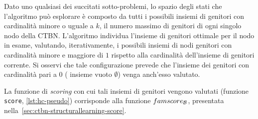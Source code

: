Dato uno qualsiasi dei succitati sotto-problemi, lo spazio degli stati che l'algoritmo \emph{\keyword{\hc{}}} può esplorare è composto da tutti i possibili insiemi di genitori con cardinalità minore o uguale a $k$, il numero massimo di genitori di ogni singolo nodo della \acs{CTBN}. L'algoritmo \emph{\keyword{\hc{}}} individua l'insieme di genitori ottimale per il nodo in esame, valutando, iterativamente, i possibili insiemi di nodi genitori con cardinalità minore e maggiore di $1$ rispetto alla cardinalità dell'insieme di genitori corrente. Si osservi che tale configurazione prevede che l'insieme dei genitori con cardinalità pari a $0$ (\ie{} insieme vuoto $\emptyset$) venga anch'esso valutato.

La funzione di \emph{scoring} con cui tali insiemi di genitori vengono valutati (funzione \lstinline[]|score|, \autoref{lst:hc-pseudo}) corrisponde alla funzione $famscore_{\mathcal{B}}$, presentata nella~\vref{sec:ctbn-structurallearning-score}.


